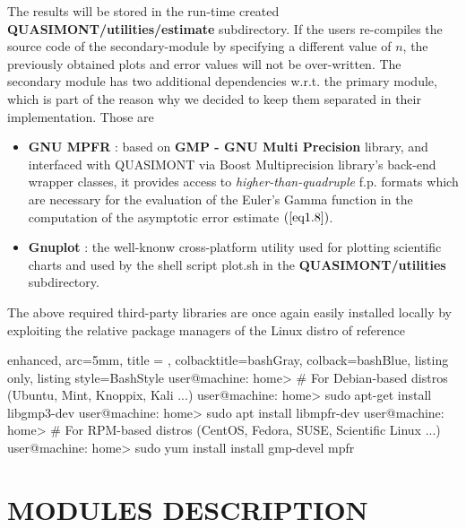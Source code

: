\documentclass[a4paper, twosided]{book}
\begin{document}
\noindent
The results will be stored in the run-time created \colorbox{poliGrayBlue}{\textbf{QUASIMONT/utilities/estimate}} subdirectory. If the users re-compiles the source code of the secondary-module by specifying a different value of $n$, the previously obtained plots and error values will not be over-written.
The secondary module has two additional dependencies w.r.t. the primary module, which is part of the reason why we decided to keep them separated in their implementation. Those are
\begin{itemize}
    \item \color{poliDarkBlue} \textbf{GNU MPFR} \color{black}\cite{mpfr}: based on \color{poliDarkBlue} \textbf{GMP - GNU Multi Precision} \color{black} library, and interfaced with QUASIMONT via Boost Multiprecision library's back-end wrapper classes, it provides access to {\itshape higher-than-quadruple} f.p. formats which are necessary for the evaluation of the Euler's Gamma function in the computation of the asymptotic error estimate $(\ref{eq1.8})$.
    \item \color{poliDarkBlue} \textbf{Gnuplot} \color{black}: the well-knonw cross-platform utility used for plotting scientific charts and used by the shell script \colorbox{poliGrayBlue}{plot.sh} in the \colorbox{poliGrayBlue}{\textbf{QUASIMONT/utilities}} subdirectory.
\end{itemize}

\noindent
The above required third-party libraries are once again easily installed locally by exploiting the relative package managers of the Linux distro of reference

\vspace{0.5cm}
\begin{tcblisting}{enhanced,
                   arc=5mm,
                   title = \color{black}{\large \ttfamily Installation of third-party libraries for the secondary module},
                   colbacktitle=bashGray,
                   colback=bashBlue,
                   listing only,
                   listing style=BashStyle}
user@machine: home> # For Debian-based distros (Ubuntu, Mint, Knoppix, Kali ...)
user@machine: home> sudo apt-get install libgmp3-dev
user@machine: home> sudo apt install libmpfr-dev
user@machine: home> # For RPM-based distros (CentOS, Fedora, SUSE, Scientific Linux ...)
user@machine: home> sudo yum install install gmp-devel mpfr
\end{tcblisting}
\vspace{0.5cm}

\chapter[Modules description]{\Huge \ttfamily MODULES DESCRIPTION}\label{Chap4}
\end{document}
